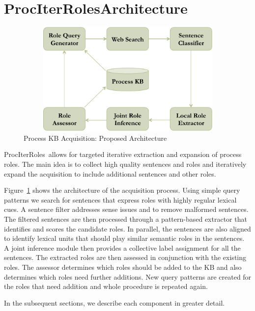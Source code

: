 \newcommand{\sys}{ProcIterRoles}

\section{\sys Architecture}

\begin{figure}[hbt]
	\begin{center}
	\includegraphics[width=5.68in,height=2.21in]{figures/architecture.pdf} 	
	\caption{\label{fig:architecture} {Process KB Acquisition: Proposed Architecture}}
	\end{center}
\end{figure}

\sys\ allows for targeted iterative extraction and expansion of process roles.
The main idea is to collect high quality sentences and roles and iteratively expand the acquisition to include
additional sentences and other roles. 

Figure~\ref{fig:architecture} shows the architecture of the acquisition process. 
Using simple query patterns we search for sentences that express roles with highly regular lexical cues. 
A sentence filter addresses sense issues and to remove malformed sentences.
The filtered sentences are then processed through a pattern-based extractor that identifies and scores the candidate roles. 
In parallel, the sentences are also aligned to identify lexical units that should play similar semantic roles in the sentences. 
A joint inference module then provides a collective label assignment for all the sentences. 
The extracted roles are then assessed in conjunction with the existing roles. 
The assessor determines which roles should be added to the KB and also determines which roles need further additions. 
New query patterns are created for the roles that need addition and whole procedure is repeated again. 

In the subsequent sections, we describe each component in greater detail.

